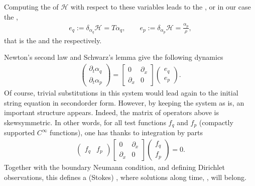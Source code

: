 \documentclass[letterpaper,10pt,english]{sphinxmanual}
\begin{document}
\sphinxAtStartPar
Computing the 
of \(\mathcal{H}\) with respect to these variables leads to the
, or in our case the ,
\begin{equation*}
\begin{split}e_q := \delta_{\alpha_q} \mathcal{H} = T \alpha_q, \qquad e_p := \delta_{\alpha_p} \mathcal{H} = \frac{\alpha_p}{\rho},\end{split}
\end{equation*}
\sphinxAtStartPar
that is the  and the  respectively.

\sphinxAtStartPar
Newton’s second law and Schwarz’s lemma give the following dynamics
\begin{equation*}
\begin{split}\begin{pmatrix} \partial_t \alpha_q \\ \partial_t \alpha_p \end{pmatrix}
=
\begin{bmatrix} 0 & \partial_x \\ \partial_x & 0 \end{bmatrix}
\begin{pmatrix} e_q \\ e_p \end{pmatrix}.\end{split}
\end{equation*}
\sphinxAtStartPar
Of course, trivial substitutions in this system would lead again to the
initial string equation in second\sphinxhyphen{}order form. However, by keeping the
system as is, an important structure appears. Indeed, the matrix of
operators above is  skew\sphinxhyphen{}symmetric. In other words, for all
test functions \(f_q\) and \(f_p\) (compactly supported
\(C^\infty\) functions), one has thanks to integration by parts
\begin{equation*}
\begin{split}\begin{pmatrix} f_q & f_p \end{pmatrix}
\begin{bmatrix} 0 & \partial_x \\ \partial_x & 0 \end{bmatrix}
\begin{pmatrix} f_q \\ f_p \end{pmatrix} = 0.\end{split}
\end{equation*}
\sphinxAtStartPar
Together with the boundary Neumann condition, and defining 
Dirichlet observations, this defines a (Stokes\sphinxhyphen{}) ,
where solutions along time,  , will belong.
\end{document}
